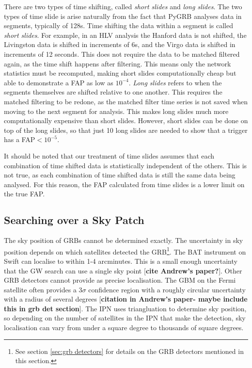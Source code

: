 \documentclass[11pt]{cuthesis}
\begin{document}
There are two types of time shifting, called \textit{short slides} and \textit{long slides}. The two types of time slide is arise naturally from the fact that PyGRB analyses data in segments, typically of 128s. Time shifting the data within a segment is called \textit{short slides}. For example, in an HLV analysis the Hanford data is not shifted, the Livingston data is shifted in increments of 6s, and the Virgo data is shifted in increments of 12 seconds. This does not require the data to be matched filtered again, as the time shift happens after filtering. This means only the network statistics must be recomputed, making short slides computationally cheap but able to demonstrate a FAP as low as $10^{-4}$. \textit{Long slides} refers to when the segments themselves are shifted relative to one another. This requires the matched filtering to be redone, as the matched filter time series is not saved when moving to the next segment for analysis. This makes long slides much more computationally expensive than short slides. However, short slides can be done on top of the long slides, so that just 10 long slides are needed to show that a trigger has a FAP$<10^{-5}$.

It should be noted that our treatment of time slides assumes that each combination of time shifted data is statistically independent of the others. This is not true, as each combination of time shifted data is still the same data being analysed. For this reason, the FAP calculated from time slides is a lower limit on the true FAP. 


\subsection{Searching over a Sky Patch}
The sky position of GRBs cannot be determined exactly. The uncertainty in sky position depends on which satellites detected the GRB\footnote{See section \ref{sec:grb detectors} for details on the GRB detectors mentioned in this section.}. The BAT instrument on Swift can localise to within 1-4 arcminutes. This is a small enough uncertainty that the GW search can use a single sky point [\textbf{cite Andrew's paper?}]. Other GRB detectors cannot provide as precise localisation. The GBM on the Fermi satellite often provides a 3$\sigma$ confidence region with a roughly circular uncertainty with a radius of several degrees [\textbf{citation in Andrew's paper- maybe include this in grb det section}]. The IPN uses triangluation to determine sky position, so depending on the number of satellites in the IPN that make the detection, sky localisation can vary from under a square degree to thousands of square degrees. 
\end{document}
